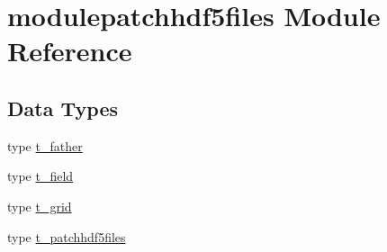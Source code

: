 \hypertarget{namespacemodulepatchhdf5files}{}\section{modulepatchhdf5files Module Reference}
\label{namespacemodulepatchhdf5files}
\subsection*{Data Types}
\begin{DoxyCompactItemize}
\item 
type \mbox{\hyperlink{structmodulepatchhdf5files_1_1t__father}{t\+\_\+father}}
\item 
type \mbox{\hyperlink{structmodulepatchhdf5files_1_1t__field}{t\+\_\+field}}
\item 
type \mbox{\hyperlink{structmodulepatchhdf5files_1_1t__grid}{t\+\_\+grid}}
\item 
type \mbox{\hyperlink{structmodulepatchhdf5files_1_1t__patchhdf5files}{t\+\_\+patchhdf5files}}
\end{DoxyCompactItemize}
